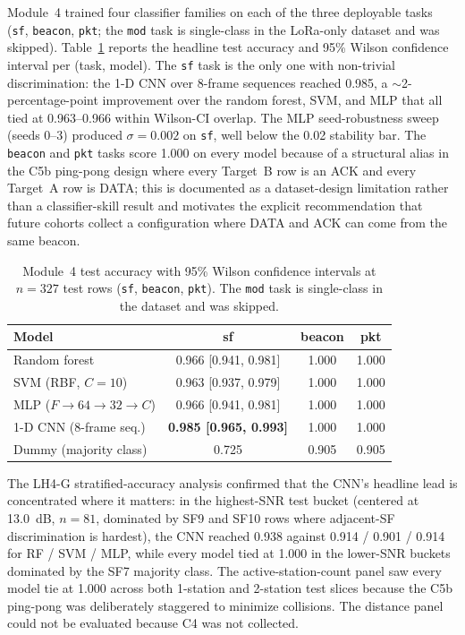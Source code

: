 \documentclass[conference]{IEEEtran}
\begin{document}
Module~4 trained four classifier families on each of the three deployable tasks (\texttt{sf}, \texttt{beacon}, \texttt{pkt}; the \texttt{mod} task is single-class in the LoRa-only dataset and was skipped). Table~\ref{tab:m4heads} reports the headline test accuracy and 95\% Wilson confidence interval per (task, model). The \texttt{sf} task is the only one with non-trivial discrimination: the 1-D CNN over 8-frame sequences reached 0.985, a $\sim$2-percentage-point improvement over the random forest, SVM, and MLP that all tied at 0.963--0.966 within Wilson-CI overlap. The MLP seed-robustness sweep (seeds 0--3) produced $\sigma=0.002$ on \texttt{sf}, well below the 0.02 stability bar. The \texttt{beacon} and \texttt{pkt} tasks score 1.000 on every model because of a structural alias in the C5b ping-pong design where every Target~B row is an ACK and every Target~A row is DATA; this is documented as a dataset-design limitation rather than a classifier-skill result and motivates the explicit recommendation that future cohorts collect a configuration where DATA and ACK can come from the same beacon.

\begin{table}[t]
\centering
\caption{Module~4 test accuracy with 95\% Wilson confidence intervals at $n=327$ test rows (\texttt{sf}, \texttt{beacon}, \texttt{pkt}). The \texttt{mod} task is single-class in the dataset and was skipped.}
\label{tab:m4heads}
\begin{tabular}{l c c c}
\toprule
\textbf{Model} & \textbf{sf} & \textbf{beacon} & \textbf{pkt} \\
\midrule
Random forest & 0.966 [0.941, 0.981] & 1.000 & 1.000 \\
SVM (RBF, $C\!=\!10$) & 0.963 [0.937, 0.979] & 1.000 & 1.000 \\
MLP ($F\!\to\!64\!\to\!32\!\to\!C$) & 0.966 [0.941, 0.981] & 1.000 & 1.000 \\
1-D CNN (8-frame seq.) & \textbf{0.985 [0.965, 0.993]} & 1.000 & 1.000 \\
Dummy (majority class) & 0.725 & 0.905 & 0.905 \\
\bottomrule
\end{tabular}
\end{table}

The LH4-G stratified-accuracy analysis confirmed that the CNN's headline lead is concentrated where it matters: in the highest-SNR test bucket (centered at 13.0~dB, $n=81$, dominated by SF9 and SF10 rows where adjacent-SF discrimination is hardest), the CNN reached 0.938 against 0.914 / 0.901 / 0.914 for RF / SVM / MLP, while every model tied at 1.000 in the lower-SNR buckets dominated by the SF7 majority class. The active-station-count panel saw every model tie at 1.000 across both 1-station and 2-station test slices because the C5b ping-pong was deliberately staggered to minimize collisions. The distance panel could not be evaluated because C4 was not collected.
\end{document}
